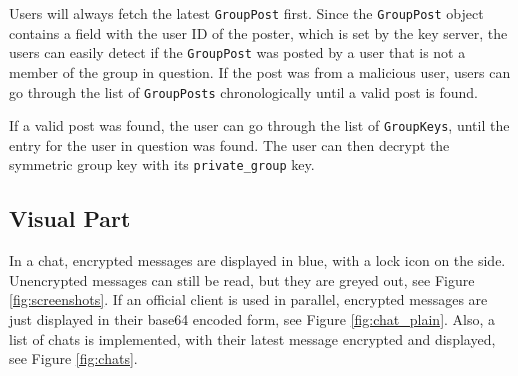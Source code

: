 \documentclass[a4paper, oneside]{discothesis}
\begin{document}
Users will always fetch the latest \texttt{GroupPost} first. Since the \texttt{GroupPost} object contains a field with the user ID of the poster, which is set by the key server, the users can easily detect if the \texttt{GroupPost} was posted by a user that is not a member of the group in question. If the post was from a malicious user, users can go through the list of \texttt{GroupPosts} chronologically until a valid post is found.

If a valid post was found, the user can go through the list of \texttt{GroupKeys}, until the entry for the user in question was found. The user can then decrypt the symmetric group key with its \texttt{private\_group} key.



\subsection{Visual Part}

In a chat, encrypted messages are displayed in blue, with a lock icon on the side. Unencrypted messages can still be read, but they are greyed out, see Figure \ref{fig:screenshots}. If an official client is used in parallel, encrypted messages are just displayed in their base64 encoded form, see Figure \ref{fig:chat_plain}. Also, a list of chats is implemented, with their latest message encrypted and displayed, see Figure \ref{fig:chats}.
\end{document}
